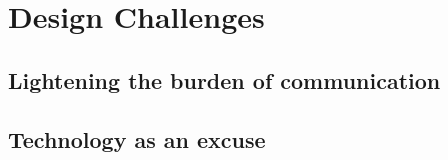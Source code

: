   \section{Design Challenges}
    \subsection{Lightening the burden of communication}

    \subsection{Technology as an excuse}


